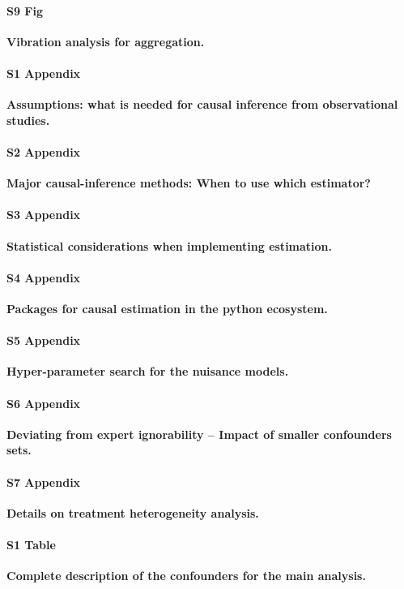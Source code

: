\documentclass[10pt,letterpaper]{article}
\begin{document}
\paragraph*{S9 Fig}
\label{apd:vibration_analysis_for_aggregation}
{\bf Vibration analysis for aggregation.}

\paragraph*{S1 Appendix}
\label{apd:causal_assumptions}
{\bf Assumptions: what is needed for causal inference from observational studies.}

\paragraph*{S2 Appendix}
\label{apd:causal_estimators}
{\bf Major causal-inference methods: When to use which estimator?}

\paragraph*{S3 Appendix}
\label{apd:statistical_considerations}
{\bf Statistical considerations when implementing
  estimation.}

\paragraph*{S4 Appendix}
\label{apd:packages}
{\bf Packages for causal estimation in the python ecosystem.}

\paragraph*{S5 Appendix}
\label{apd:hyper_parameter_search}
{\bf Hyper-parameter search for the nuisance models.}

\paragraph*{S6 Appendix}
\label{apd:vibration_analysis_for_confounders}
{\bf Deviating from expert ignorability -- Impact of smaller confounders sets.}

\paragraph*{S7 Appendix}
\label{apd:hte}
{\bf Details on treatment heterogeneity analysis.}

\paragraph*{S1 Table}
\label{apd:albumin_for_sepsis:table1_complete}
{\bf Complete description of the confounders for the main analysis.}
\end{document}
